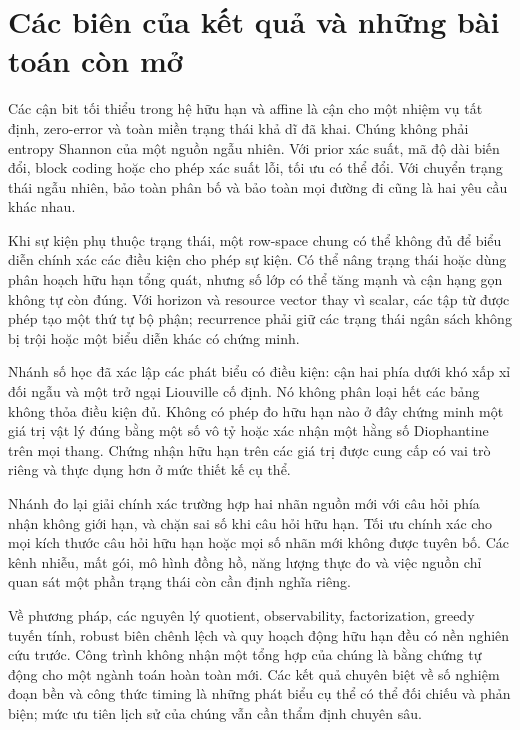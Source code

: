 \section{Các biên của kết quả và những bài toán còn mở}
Các cận bit tối thiểu trong hệ hữu hạn và affine là cận cho một nhiệm vụ tất định, zero-error và toàn miền trạng thái khả dĩ đã khai. Chúng không phải entropy Shannon của một nguồn ngẫu nhiên. Với prior xác suất, mã độ dài biến đổi, block coding hoặc cho phép xác suất lỗi, tối ưu có thể đổi. Với chuyển trạng thái ngẫu nhiên, bảo toàn phân bố và bảo toàn mọi đường đi cũng là hai yêu cầu khác nhau.

Khi sự kiện phụ thuộc trạng thái, một row-space chung có thể không đủ để biểu diễn chính xác các điều kiện cho phép sự kiện. Có thể nâng trạng thái hoặc dùng phân hoạch hữu hạn tổng quát, nhưng số lớp có thể tăng mạnh và cận hạng gọn không tự còn đúng. Với horizon và resource vector thay vì scalar, các tập từ được phép tạo một thứ tự bộ phận; recurrence phải giữ các trạng thái ngân sách không bị trội hoặc một biểu diễn khác có chứng minh.

Nhánh số học đã xác lập các phát biểu có điều kiện: cận hai phía dưới khó xấp xỉ đối ngẫu và một trở ngại Liouville cố định. Nó không phân loại hết các bảng không thỏa điều kiện đủ. Không có phép đo hữu hạn nào ở đây chứng minh một giá trị vật lý đúng bằng một số vô tỷ hoặc xác nhận một hằng số Diophantine trên mọi thang. Chứng nhận hữu hạn trên các giá trị được cung cấp có vai trò riêng và thực dụng hơn ở mức thiết kế cụ thể.

Nhánh đo lại giải chính xác trường hợp hai nhãn nguồn mới với câu hỏi phía nhận không giới hạn, và chặn sai số khi câu hỏi hữu hạn. Tối ưu chính xác cho mọi kích thước câu hỏi hữu hạn hoặc mọi số nhãn mới không được tuyên bố. Các kênh nhiễu, mất gói, mô hình đồng hồ, năng lượng thực đo và việc nguồn chỉ quan sát một phần trạng thái còn cần định nghĩa riêng.

Về phương pháp, các nguyên lý quotient, observability, factorization, greedy tuyến tính, robust biên chênh lệch và quy hoạch động hữu hạn đều có nền nghiên cứu trước. Công trình không nhận một tổng hợp của chúng là bằng chứng tự động cho một ngành toán hoàn toàn mới. Các kết quả chuyên biệt về số nghiệm đoạn bền và công thức timing là những phát biểu cụ thể có thể đối chiếu và phản biện; mức ưu tiên lịch sử của chúng vẫn cần thẩm định chuyên sâu.

